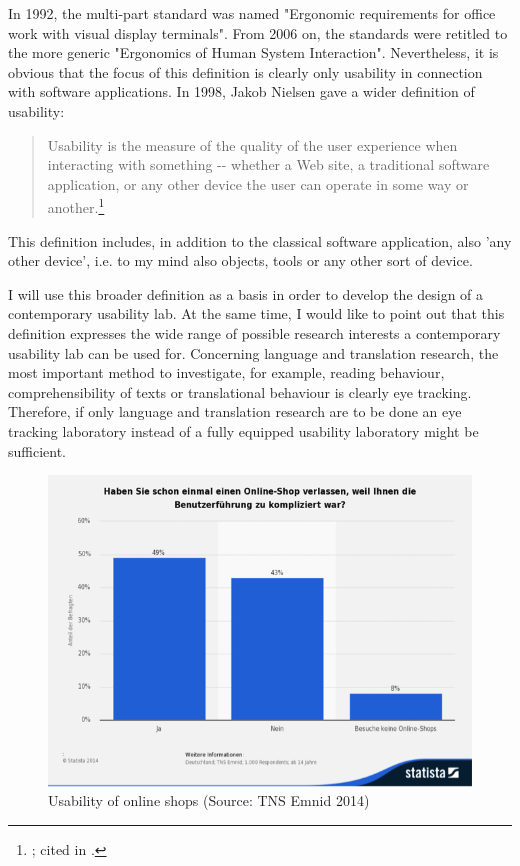 \documentclass[output=paper]{langsci/langscibook}
\begin{document}
In 1992, the multi-part standard was named "Ergonomic requirements for office work with visual display terminals". From 2006 on, the standards were retitled to the more generic "Ergonomics of Human System Interaction". Nevertheless, it is obvious that the focus of this definition is clearly only usability in connection with software applications. In 1998, Jakob Nielsen gave a wider definition of usability:

\begin{quote}
Usability is the measure of the quality of the user experience when interacting with something -{}- whether a Web site, a traditional software application, or any other device the user can operate in some way or another.\footnote{ \citet{Nielsen1998}; cited in \citet{Eichinger1999}.}
\end{quote}

This definition includes, in addition to the classical software application, also 'any other device', i.e. to my mind also objects, tools or any other sort of device. 

I will use this broader definition as a basis in order to develop the design of a contemporary usability lab. At the same time, I would like to point out that this definition expresses the wide range of possible research interests a contemporary usability lab can be used for. Concerning language and translation research, the most important method to investigate, for example, reading behaviour, comprehensibility of texts or translational behaviour is clearly eye tracking. Therefore, if only language and translation research are to be done an eye tracking laboratory instead of a fully equipped usability laboratory might be sufficient.

  
\begin{figure}
 \includegraphics[width=\textwidth]{figures/Roesener1.png}
 \caption{Usability of online shops (Source: TNS Emnid 2014)}
 \label{fig:1}
\end{figure} 
 
\end{document}
